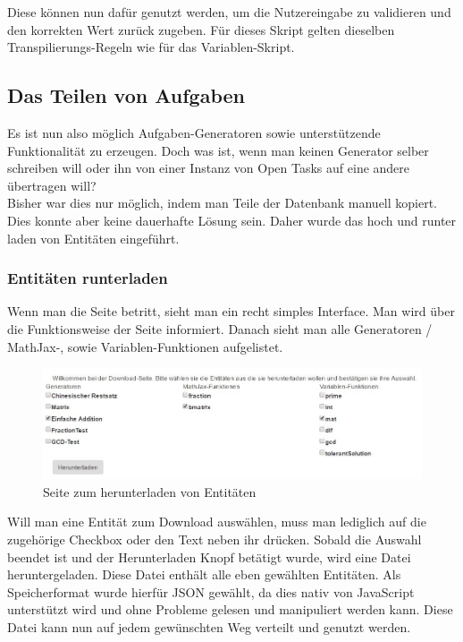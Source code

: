 Diese können nun dafür genutzt werden, um die Nutzereingabe zu validieren und den korrekten Wert zurück zugeben. Für dieses Skript gelten dieselben Transpilierungs-Regeln wie für das Variablen-Skript.


\subsection{Das Teilen von Aufgaben}

Es ist nun also möglich Aufgaben-Generatoren sowie unterstützende Funktionalität zu erzeugen. Doch was ist, wenn man keinen Generator selber schreiben will oder ihn von einer Instanz von Open Tasks auf eine andere übertragen will? \\
Bisher war dies nur möglich, indem man Teile der Datenbank manuell kopiert. Dies konnte aber keine dauerhafte Lösung sein. Daher wurde das hoch und runter laden von Entitäten eingeführt.
\subsubsection{Entitäten runterladen}


Wenn man die Seite betritt, sieht man ein recht simples Interface. Man wird über die Funktionsweise der Seite informiert. Danach sieht man alle Generatoren / MathJax-, sowie Variablen-Funktionen aufgelistet. \\

\begin{figure}[htp]     %
\centering
\includegraphics[width=1\textwidth]{bilder/DownloadEntities} 
\caption[Seite zum herunterladen von Entitäten]{Seite zum herunterladen von Entitäten}
\end{figure} 


Will man eine Entität zum Download auswählen, muss man lediglich auf die zugehörige Checkbox oder den Text neben ihr drücken. Sobald die Auswahl beendet ist und der Herunterladen Knopf betätigt wurde, wird eine Datei heruntergeladen. Diese Datei enthält alle eben gewählten Entitäten. Als Speicherformat wurde hierfür JSON gewählt, da dies nativ von JavaScript unterstützt wird und ohne Probleme gelesen und manipuliert werden kann. Diese Datei kann nun auf jedem gewünschten Weg verteilt und genutzt werden.


